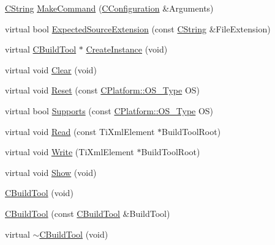 \begin{DoxyCompactItemize}
\item 
\hyperlink{classCString}{C\-String} \hyperlink{classCBuildTool_a34da772ee708afd2f77e6222752ea2b4}{Make\-Command} (\hyperlink{classCConfiguration}{C\-Configuration} \&Arguments)
\item 
virtual bool \hyperlink{classCBuildTool_a34ad2894ff945f054ccd86db4007934f}{Expected\-Source\-Extension} (const \hyperlink{classCString}{C\-String} \&File\-Extension)
\item 
virtual \hyperlink{classCBuildTool}{C\-Build\-Tool} $\ast$ \hyperlink{classCBuildTool_aa7f0e7c0bd7f75c71d37df066bcb581e}{Create\-Instance} (void)
\item 
virtual void \hyperlink{classCBuildTool_ae36693eb03f822b8971a4e4b036111c2}{Clear} (void)
\item 
virtual void \hyperlink{classCBuildTool_abea21a0e61ab2177effdff5aaa169585}{Reset} (const \hyperlink{classCPlatform_a2fb735c63c53052f79629e338bb0f535}{C\-Platform\-::\-O\-S\-\_\-\-Type} O\-S)
\item 
virtual bool \hyperlink{classCBuildTool_ad07fcd46ccc841bc131d65505e5343c1}{Supports} (const \hyperlink{classCPlatform_a2fb735c63c53052f79629e338bb0f535}{C\-Platform\-::\-O\-S\-\_\-\-Type} O\-S)
\item 
virtual void \hyperlink{classCBuildTool_a299d87943c0f68dde5316318cc0838f8}{Read} (const Ti\-Xml\-Element $\ast$Build\-Tool\-Root)
\item 
virtual void \hyperlink{classCBuildTool_af0331a777785bc2d15236b5c74321ed2}{Write} (Ti\-Xml\-Element $\ast$Build\-Tool\-Root)
\item 
virtual void \hyperlink{classCBuildTool_a69815d1393a61dc16b2cc2d0552cd5ac}{Show} (void)
\item 
\hyperlink{classCBuildTool_a26f646e16e31257c97663d5651d60fdf}{C\-Build\-Tool} (void)
\item 
\hyperlink{classCBuildTool_aa4a2205a51b4c6b106f6218b63fd0f2d}{C\-Build\-Tool} (const \hyperlink{classCBuildTool}{C\-Build\-Tool} \&Build\-Tool)
\item 
virtual \hyperlink{classCBuildTool_a20a976c3fc44994a8f0a527869243409}{$\sim$\-C\-Build\-Tool} (void)
\end{DoxyCompactItemize}
